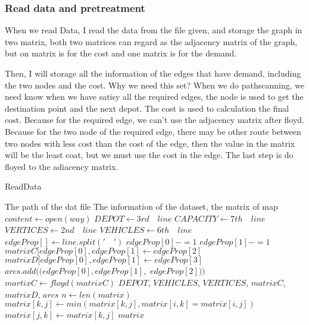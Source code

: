 \documentclass[conference,compsoc]{IEEEtran}
\begin{document}
    \subsubsection{Read data and pretreatment}
      When we read Data, I read the data from the file given, and storage the graph in two matrix, both two matrices can 
      regard as the adjacency matrix of the graph, but on matrix is for the cost and one matrix is for the demand.

      Then, I will storage all the information of the edges that have demand, including the two nodes and the cost. Why we need this set?
      When we do pathscanning, we need know when we have satisy all the required edges, the node is used to get the destination point and the next depot.
      The cost is used to calculation the final cost. Because for the required edge, we can't use the adjacency matrix after floyd. Because for the two node of the required edge, there may be other route between two nodes with less cost than the cost of the edge, then the value in the matrix will be the least coat, but we must use the cost in the edge.
      The last step is do floyed to the adiacency matrix.
      \begin{algorithm}
        \caption{ReadData}
        \begin{algorithmic}[1]
          \Require The path of the dat file
          \Ensure The information of the dataset, the matrix of map
            \State $content \gets open(way)$
            \State $DEPOT\gets 3rd \quad line$
            \State $CAPACITY \gets 7th \quad line$
            \State $VERTICES \gets 2nd \quad line$
            \State $VEHICLES \gets 6th \quad line$
              \State $edgeProp[] \gets line.split('\quad')$
              \State $edgeProp[0] -= 1$
              \State $edgeProp[1] -= 1$
              \State $matrixC[edgeProp[0],edgeProp[1]$$ \gets edgeProp[2]$
              \State $matrixD[edgeProp[0],edgeProp[1] \gets edgeProp[3]$
                \State $arcs.add((edgeProp[0],edgeProp[1],$
                $edgeProp[2]))$
              \EndIf  
            \EndWhile
            \State $martixC \gets floyd(matrixC)$
            \State \Return $DEPOT$, $VEHICLES$, $VERTICES$, $matrixC$, $matrixD$, $arcs$
          \EndFunction
            \State $n \gets len(matrix)$
                    \State $matrix[k,j] \gets min(matrix[k,j], matrix[i,k]=matrix[i,j])$
                    \State $matrix[j,k]\gets matrix[k,j]$
                  \EndIf
                \EndFor
              \EndFor  
            \EndFor
            \State \Return $matrix$
          \EndFunction
        \end{algorithmic}
      \end{algorithm}
\end{document}
